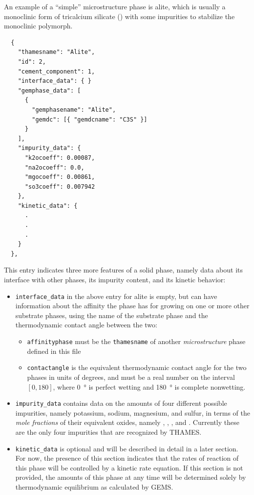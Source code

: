 \documentclass{article}
\begin{document}
{An example of a ``simple'' microstructure phase is alite,
which is usually a monoclinic form of tricalcium silicate
() with some impurities to stabilize the monoclinic
polymorph.
\scriptsize{
	\begin{lstlisting}
  {
    "thamesname": "Alite",
    "id": 2,
    "cement_component": 1,
    "interface_data": { }
    "gemphase_data": [
      {
        "gemphasename": "Alite",
        "gemdc": [{ "gemdcname": "C3S" }]
      }
    ],
    "impurity_data": {
      "k2ocoeff": 0.00087,
      "na2ocoeff": 0.0,
      "mgocoeff": 0.00861,
      "so3coeff": 0.007942
    },
    "kinetic_data": {
      .
      .
      .
    }
  },
 \end{lstlisting}
}

\normalsize{ }
This entry indicates three more features of a solid phase, namely
data about its interface with other phases, its impurity content,
and its kinetic behavior:
\begin{itemize}
	\item \verb!interface_data! in the above entry for alite
	      is empty, but can have information about the affinity the
	      phase has for growing on one or more other substrate phases, using
	      the name of the substrate phase and the thermodynamic contact
	      angle between the two:
	      \begin{itemize}
		      \item \verb!affinityphase! must be the \verb!thamesname! of
		            another \textit{microstructure} phase defined in this file
		      \item \verb!contactangle! is the equivalent thermodynamic
		            contact angle for the two phases in units of degrees,
		            and must be a real number on the interval $\left[0,180\right]$,
		            where \qty{0}{\degree} is perfect wetting and
		            \qty{180}{\degree} is complete nonwetting.
	      \end{itemize}
	\item \verb!impurity_data! contains data on the amounts
	      of four different possible impurities, namely
	      potassium, sodium, magnesium, and sulfur, in terms
	      of the \textit{mole fractions} of their equivalent oxides,
	      namely , , , and .
	      Currently these are the only four impurities that
	      are recognized by THAMES.
	\item \verb!kinetic_data! is optional and will be described
	      in detail in a later section. For now, the presence of this
	      section indicates that the rates of reaction of this phase
	      will be controlled by a kinetic rate equation. If this
	      section is not provided, the amounts of this phase at any
	      time will be determined solely by thermodynamic equilibrium
	      as calculated by GEMS.
\end{itemize}

}
\end{document}
